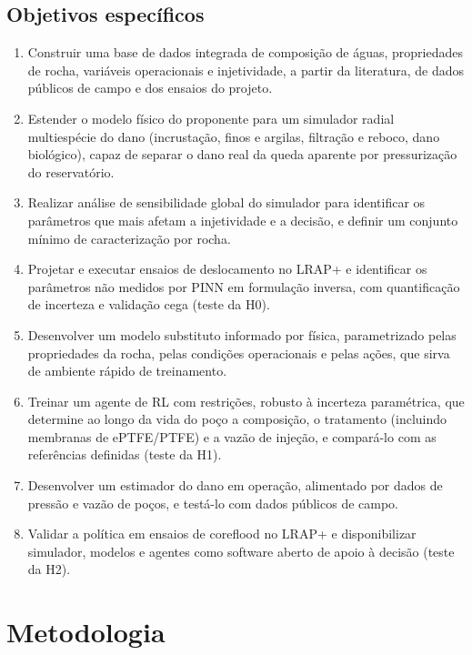\documentclass[11pt,a4paper]{article}
\newcommand{\itemedital}[1]{}
\begin{document}
\subsection{Objetivos específicos}
\begin{enumerate}[label=OE\arabic*.]
  \item Construir uma base de dados integrada de composição de águas, propriedades de
        rocha, variáveis operacionais e injetividade, a partir da literatura, de dados
        públicos de campo e dos ensaios do projeto.
  \item Estender o modelo físico do proponente para um simulador radial multiespécie do
        dano (incrustação, finos e argilas, filtração e reboco, dano biológico), capaz de
        separar o dano real da queda aparente por pressurização do reservatório.
  \item Realizar análise de sensibilidade global do simulador para identificar os
        parâmetros que mais afetam a injetividade e a decisão, e definir um conjunto
        mínimo de caracterização por rocha.
  \item Projetar e executar ensaios de deslocamento no LRAP+ e identificar os parâmetros
        não medidos por PINN em formulação inversa, com quantificação de incerteza e
        validação cega (teste da H0).
  \item Desenvolver um modelo substituto informado por física, parametrizado pelas
        propriedades da rocha, pelas condições operacionais e pelas ações, que sirva de
        ambiente rápido de treinamento.
  \item Treinar um agente de RL com restrições, robusto à incerteza paramétrica, que
        determine ao longo da vida do poço a composição, o tratamento (incluindo
        membranas de ePTFE/PTFE) e a vazão de injeção, e compará-lo com as referências
        definidas (teste da H1).
  \item Desenvolver um estimador do dano em operação, alimentado por dados de pressão e
        vazão de poços, e testá-lo com dados públicos de campo.
  \item Validar a política em ensaios de coreflood no LRAP+ e disponibilizar simulador,
        modelos e agentes como software aberto de apoio à decisão (teste da H2).
\end{enumerate}

\section{Metodologia}\label{sec:metodo}\itemedital{2.16 XII}
\end{document}
